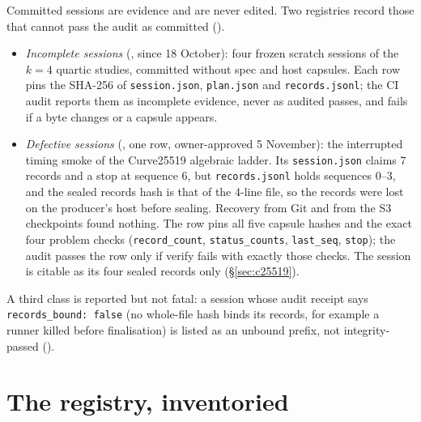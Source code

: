 Committed sessions are evidence and are never edited. Two registries record
those that cannot pass the audit as committed
().
\begin{itemize}
\item \emph{Incomplete sessions} (,
  since 18 October): four frozen scratch sessions of the $k=4$
  quartic studies, committed without spec and host capsules. Each row pins
  the SHA-256 of \texttt{session.json}, \texttt{plan.json} and
  \texttt{records.jsonl}; the CI audit reports them as incomplete
  evidence, never as audited passes, and fails if a byte changes or a
  capsule appears.
\item \emph{Defective sessions} (,
  one row, owner-approved 5 November): the interrupted timing smoke of the
  Curve25519 algebraic ladder. Its \texttt{session.json} claims 7 records
  and a stop at sequence 6, but \texttt{records.jsonl} holds sequences
  0--3, and the sealed records hash is that of the 4-line file, so the
  records were lost on the producer's host before sealing. Recovery from
  Git and from the S3 checkpoints found nothing. The row pins all five
  capsule hashes and the exact four problem checks
  (\texttt{record\_count}, \texttt{status\_counts}, \texttt{last\_seq},
  \texttt{stop}); the audit passes the row only if verify fails with
  exactly those checks. The session is citable as its four sealed records
  only (\S\ref{sec:c25519}).
\end{itemize}
A third class is reported but not fatal: a session whose audit receipt says
\texttt{records\_bound: false} (no whole-file hash binds its records, for
example a runner killed before finalisation) is listed as an unbound prefix,
not integrity-passed ().

\section{The registry, inventoried}\label{sec:em-inventory}

